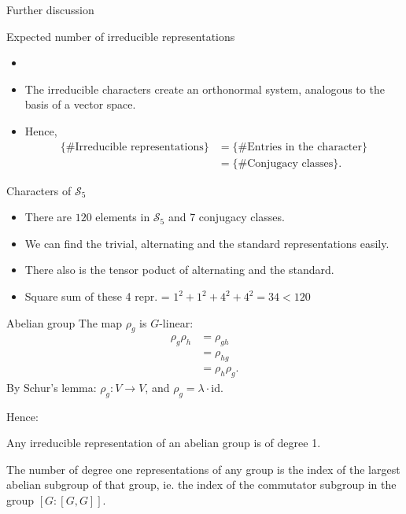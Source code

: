 \documentclass[10pt]{beamer}
\newcommand{\Sym}{\mathcal{S}}
\newcommand{\id}{\text{id}}
\begin{document}
	
	\begin{frame}[allowframebreaks]{Further discussion}
		
		\begin{block}{Expected number of irreducible representations}
			\begin{itemize}
				\item \item The irreducible characters create an orthonormal system, analogous to the basis of a vector space.
			
				\item Hence, \begin{align*}
					\{\text{\# Irreducible representations}\} &= \{\text{\# Entries in the character}\} \\
					&= \{\text{\# Conjugacy classes}\}.
				\end{align*}
			\end{itemize}
		\end{block}
		\begin{block}{Characters of $\Sym_5$}
			\begin{itemize}
				\item There are $120$ elements in $\Sym_5$ and 7 conjugacy classes.
				
				\item We can find the trivial, alternating and the standard representations easily.
				
				\item There also is the tensor poduct of alternating and the standard.
				
				\item Square sum of these 4 repr. = $1^2 + 1^2 + 4^2 + 4^2 = 34 < 120$
			\end{itemize}
		\end{block}
				
		\begin{block}{Abelian group}
			The map $\rho_g$ is $G$-linear: \begin{align*}
				\rho_g \rho_h &= \rho_{gh} \\
				&= \rho_{hg} \\
				&= \rho_h \rho_g.
			\end{align*}
			By Schur's lemma: $\rho_g : V \rightarrow V$, and $\rho_g = \lambda \cdot \id$. 
		\end{block}
		
		Hence:
		\begin{theorem}
			Any irreducible representation of an abelian group is of degree 1.
		\end{theorem}
		
		
		The number of degree one representations of any group is the index of the largest abelian subgroup of that group, ie. the index of the commutator subgroup in the group $[G:[G,G]]$.
	\end{frame}
	

	
\end{document}
